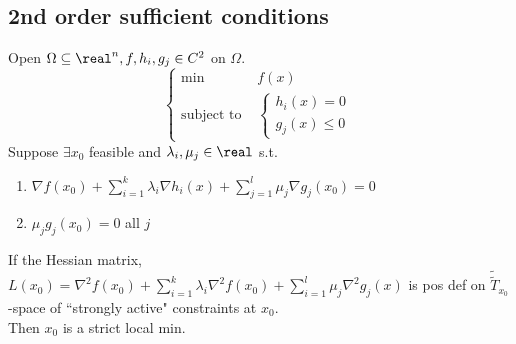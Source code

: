 \documentclass[11pt]{article}
\begin{document}
\subsection{2nd order sufficient conditions}
Open $\Omega \subseteq \real^n, f, h_i, g_j \in C^2$ on $\Omega$. \\
$$\begin{cases}
	\min &f(x) \\
	\text{subject to }&\begin{cases}h_i(x) = 0 \\
	g_j(x) \leq 0 \end{cases}
\end{cases}$$
Suppose $\exists x_0$ feasible and $\lambda_i, \mu_j \in \real$ s.t. 
\begin{enumerate}
	\item $\nabla f(x_0) + \sum_{i=1}^k \lambda_i \nabla h_i(x) + \sum_{j=1}^l \mu_j \nabla g_j(x_0) = 0$
	\item $\mu_j g_j(x_0) =0$ all $j$
\end{enumerate}
If the Hessian matrix, $L(x_0) = \nabla^2 f(x_0) + \sum_{i=1}^k \lambda_i \nabla^2 f(x_0) + \sum_{i=1}^l \mu_j \nabla^2 g_j(x)$ is pos def on $\tilde{\tilde{T}}_{x_0}$-space of ``strongly active" constraints at $x_0$. \\
Then $x_0$ is a strict local min. \\
\end{document}
